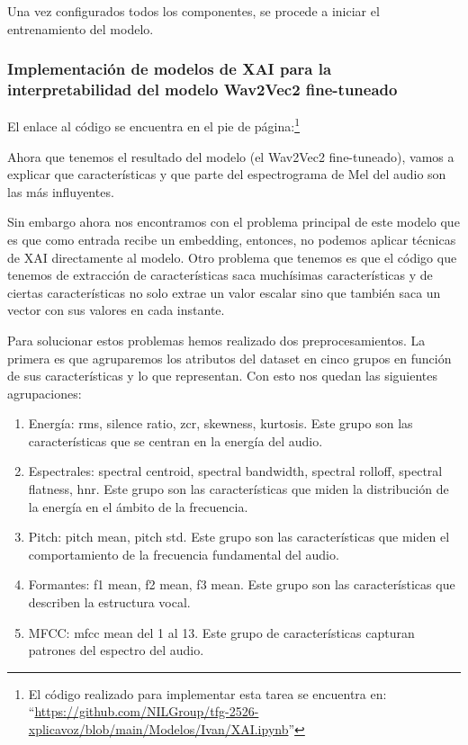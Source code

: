 Una vez configurados todos los componentes, se procede a iniciar el entrenamiento del modelo.

\subsubsection*{Implementación de modelos de XAI para la interpretabilidad del modelo Wav2Vec2 fine-tuneado}

El enlace al código se encuentra en el pie de página:\footnote{El código realizado para implementar esta tarea se encuentra en: ``\href{https://github.com/NILGroup/tfg-2526-xplicavoz/blob/main/Modelos/Ivan/XAI.ipynb}{https://github.com/NILGroup/tfg-2526-xplicavoz/blob/main/Modelos/Ivan/XAI.ipynb}''}

Ahora que tenemos el resultado del modelo (el Wav2Vec2 fine-tuneado), vamos a explicar que características y que parte del espectrograma de Mel del audio son las más influyentes.

Sin embargo ahora nos encontramos con el problema principal de este modelo que es que como entrada recibe un embedding, entonces, no podemos aplicar técnicas de XAI directamente al modelo. Otro problema que tenemos es que el código que tenemos de extracción de características saca muchísimas características y de ciertas características no solo extrae un valor escalar sino que también saca un vector con sus valores en cada instante.

Para solucionar estos problemas hemos realizado dos preprocesamientos. La primera es que agruparemos los atributos del dataset en cinco grupos en función de sus características y lo que representan. Con esto nos quedan las siguientes agrupaciones:

\begin{enumerate}
 \item Energía: rms, silence ratio, zcr, skewness, kurtosis. Este grupo son las características que se centran en la energía del audio.
 
 \item Espectrales: spectral centroid, spectral bandwidth, spectral rolloff, spectral flatness, hnr. Este grupo son las características que miden la distribución de la energía en el ámbito de la frecuencia.
 
 \item Pitch: pitch mean, pitch std. Este grupo son las características que miden el comportamiento de la frecuencia fundamental del audio.
 
 \item Formantes:  f1 mean, f2 mean, f3 mean. Este grupo son las características que describen la estructura vocal.
 
 \item MFCC: mfcc mean del 1 al 13. Este grupo de características capturan patrones del espectro del audio.
\end{enumerate}

